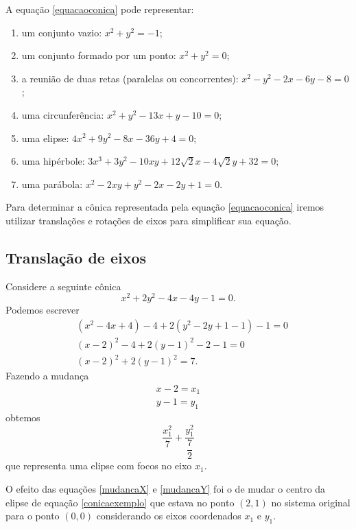 A equa\c{c}\~ao \eqref{equacaoconica} pode representar:
\begin{enumerate}
  \item um conjunto vazio: $x^2 + y^2 = -1$;
  \item um conjunto formado por um ponto: $x^2 + y^2 = 0$;
  \item a reuni\~ao de duas retas (paralelas ou concorrentes): $x^2 - y^2 - 2x - 6y -8 =0$;
  \item uma circunfer\^encia: $x^2 + y^2 - 13x + y - 10 = 0$;
  \item uma elipse: $4x^2 + 9y^2 - 8x - 36y + 4 = 0$;
  \item uma hip\'erbole: $3x^3 + 3y^2 - 10xy + 12\sqrt{2}x - 4\sqrt{2}y + 32 = 0$;
  \item uma par\'abola: $x^2 - 2xy + y^2 -2x - 2y + 1 = 0$.
\end{enumerate}

Para determinar a c\^onica representada pela equa\c{c}\~ao \eqref{equacaoconica} iremos utilizar transla\c{c}\~oes e rota\c{c}\~oes de eixos para simplificar sua equa\c{c}\~ao.

\subsection{Transla\c{c}\~ao de eixos} %
\label{sub:translacaoo_de_eixos}
Considere a seguinte c\^onica
\begin{equation}\label{conicaexemplo}
  x^2 + 2y^2 - 4x - 4y - 1 = 0.
\end{equation}
Podemos escrever
\begin{align*}
  &(x^2 - 4x + 4) - 4 + 2(y^2 - 2y + 1 - 1) - 1 = 0\\
  &(x - 2)^2 - 4 + 2(y - 1)^2 - 2 - 1 = 0\\
  &(x - 2)^2 + 2(y - 1)^2 = 7.
\end{align*}
Fazendo a mudan\c{c}a
\begin{align}
  x - 2 = x_1\label{mudancaX}\\
  y - 1 = y_1\label{mudancaY}
\end{align}
obtemos
\[
  \dfrac{x_1^2}{7} + \dfrac{y_1^2}{\dfrac{7}{2}}
\]
que representa uma elipse com focos no eixo $x_1$.

O efeito das equa\c{c}\~oes \eqref{mudancaX} e \eqref{mudancaY} foi o de mudar o centro da elipse de equa\c{c}\~ao \eqref{conicaexemplo} que estava no ponto $(2,1)$ no sistema original para o ponto $(0,0)$ considerando os eixos coordenados $x_1$ e $y_1$. 

